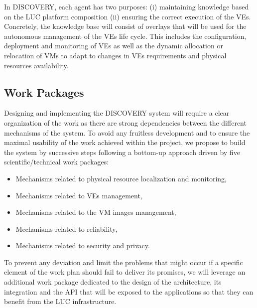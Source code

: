 \documentclass[11pt,a4paper,twoside]{article}
\newcommand{\discovery}{DISCOVERY\xspace}
\begin{document}
In \discovery, each agent has two purposes: (i) maintaining knowledge based on the
LUC platform composition (ii) ensuring the correct execution of the VEs. 
Concretely, the knowledge base will consist of overlays that will be used 
for the autonomous management of the
VEs life cycle. This includes the configuration, deployment and monitoring of
VEs as well as the dynamic allocation or relocation of VMs to adapt to changes
in VEs requirements and physical resources availability.

\subsection{Work Packages}
Designing and implementing the \discovery system will require a clear organization of the work
as there are strong dependencies between the different mechanisms of the
system. To avoid any fruitless development and to ensure the maximal usability of
the work achieved within the project, we propose to build the system by
successive steps following a bottom-up approach driven by five scientific/technical work packages:

\begin{itemize}
\item Mechanisms related to physical resource localization and monitoring, 
\item Mechanisms related to VEs management, 
\item Mechanisms related to the VM images management, 
\item Mechanisms related to reliability,
\item Mechanisms related to security and privacy.
\end{itemize}

To prevent any deviation and limit the problems that might occur if a specific
element of the work plan should fail to deliver its promises, we will leverage
an additional work package dedicated to the design of the architecture, its
integration and the API that will be exposed to the applications so that they
can benefit from the LUC infrastructure.  
\end{document}
